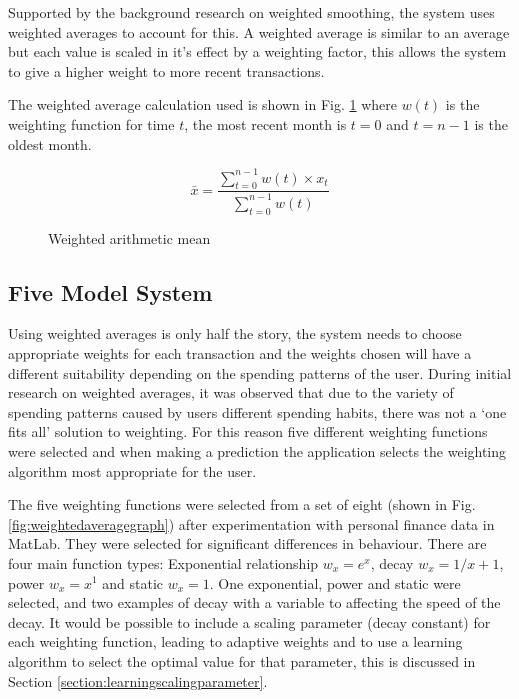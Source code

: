 Supported by the background research on weighted smoothing, the system uses weighted averages to account for this. A weighted average is similar to an average but each value is scaled in it's effect by a weighting factor, this allows the system to give a higher weight to more recent transactions.

The weighted average calculation used is shown in Fig. \ref{fig:weighting} where $w(t)$ is the weighting function for time $t$, the most recent month is $t = 0$ and $t = n - 1$ is the oldest month. 

\begin{figure}[h]
    \centering
    \[
        \bar{x} = 
        \frac{
                \sum\limits^{n-1}_{t=0}{w(t) \times x_t}
            }{
                \sum\limits_{t=0}^{n-1}{w(t)}
        } 
    \]
    \caption{Weighted arithmetic mean}
    \label{fig:weighting}
\end{figure}

\subsection{Five Model System}
Using weighted averages is only half the story, the system needs to choose appropriate weights for each transaction and the weights chosen will have a different suitability depending on the spending patterns of the user.
% 
During initial research on weighted averages, it was observed that due to the variety of spending patterns caused by users different spending habits, there was not a `one fits all' solution to weighting.
%
For this reason five different weighting functions were selected and when making a prediction the application selects the weighting algorithm most appropriate for the user.

The five weighting functions were selected from a set of eight (shown in Fig. \ref{fig:weightedaveragegraph}) after experimentation with personal finance data in MatLab. They were selected for significant differences in behaviour.
%
There are four main function types: Exponential relationship $w_x = e^{x}$, decay $w_x = {1}/{x + 1}$, power $w_x = x^1 $ and static $w_x = 1$. One exponential, power and static were selected, and two examples of decay with a variable to affecting the speed of the decay. It would be possible to include a scaling parameter (decay constant) for each weighting function, leading to adaptive weights and to use a learning algorithm to select the optimal value for that parameter, this is discussed in Section \ref{section:learningscalingparameter}.

